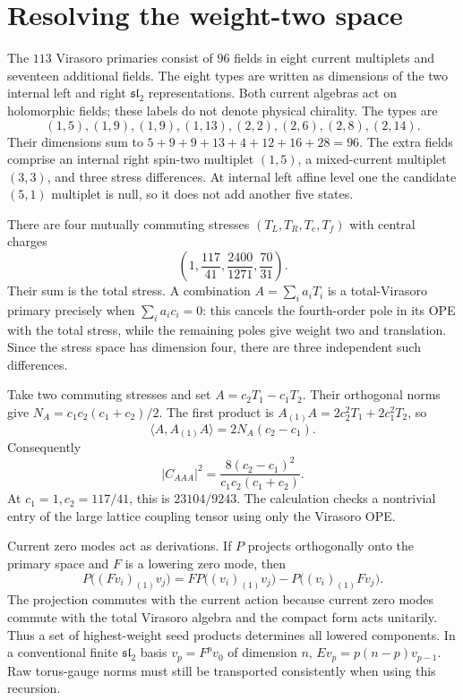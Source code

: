 \section{Resolving the weight-two space}

The $113$ Virasoro primaries consist of $96$ fields in eight
current multiplets and seventeen additional fields. The eight
types are written as dimensions of the two internal left and right
$\mathfrak{sl}_2$ representations. Both current algebras act on
holomorphic fields; these labels do not denote physical chirality.
The types are
\[
 (1,5),(1,9),(1,9),(1,13),(2,2),(2,6),(2,8),(2,14).
\]
Their dimensions sum to
$5+9+9+13+4+12+16+28=96$.
The extra fields comprise an internal right spin-two multiplet $(1,5)$,
a mixed-current multiplet $(3,3)$, and three stress differences.
At internal left affine level one the candidate $(5,1)$ multiplet is null,
so it does not add another five states.

There are four mutually commuting stresses
$(T_L,T_R,T_e,T_f)$ with central charges
\begin{equation}
 \left(1,\frac{117}{41},\frac{2400}{1271},\frac{70}{31}\right).
 \label{eq:corr-four-stresses}
\end{equation}
Their sum is the total stress. A combination $A=\sum_i a_iT_i$
is a total-Virasoro primary precisely when
$\sum_i a_ic_i=0$: this cancels the fourth-order pole in its
OPE with the total stress, while the remaining poles give weight
two and translation. Since the stress space has dimension four,
there are three independent such differences.

\begin{example}
\label{ex:corr-stress-cubic}
Take two commuting stresses and set $A=c_2T_1-c_1T_2$.
Their orthogonal norms give
$N_A=c_1c_2(c_1+c_2)/2$.
The first product is
$A_{(1)}A=2c_2^2T_1+2c_1^2T_2$, so
\[
 \langle A,A_{(1)}A\rangle=2N_A(c_2-c_1).
\]
Consequently
\begin{equation}
 |C_{AAA}|^2
 =\frac{8(c_2-c_1)^2}{c_1c_2(c_1+c_2)}.
 \label{eq:corr-stress-cubic}
\end{equation}
At $c_1=1,c_2=117/41$, this is $23104/9243$.
The calculation checks a nontrivial entry of the large lattice
coupling tensor using only the Virasoro OPE.
\end{example}

Current zero modes act as derivations. If $P$ projects orthogonally
onto the primary space and $F$ is a lowering zero mode, then
\begin{equation}
 P\bigl((Fv_i)_{(1)}v_j\bigr)
 =F P\bigl((v_i)_{(1)}v_j\bigr)
          -P\bigl((v_i)_{(1)}Fv_j\bigr).
 \label{eq:corr-ward-completion}
\end{equation}
The projection commutes with the current action because current
zero modes commute with the total Virasoro algebra and the compact
form acts unitarily. Thus a set of highest-weight seed products
determines all lowered components. In a conventional finite
$\mathfrak{sl}_2$ basis $v_p=F^pv_0$ of dimension $n$,
$Ev_p=p(n-p)v_{p-1}$. Raw torus-gauge norms must still be
transported consistently when using this recursion.

